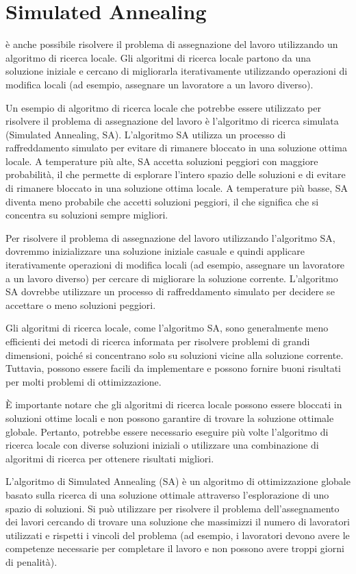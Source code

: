 \section {Simulated Annealing}
 è anche possibile risolvere il problema di assegnazione del lavoro utilizzando un algoritmo di ricerca locale. Gli algoritmi di ricerca locale partono da una soluzione iniziale e cercano di migliorarla iterativamente utilizzando operazioni di modifica locali (ad esempio, assegnare un lavoratore a un lavoro diverso).

Un esempio di algoritmo di ricerca locale che potrebbe essere utilizzato per risolvere il problema di assegnazione del lavoro è l'algoritmo di ricerca simulata (Simulated Annealing, SA). L'algoritmo SA utilizza un processo di raffreddamento simulato per evitare di rimanere bloccato in una soluzione ottima locale. A temperature più alte, SA accetta soluzioni peggiori con maggiore probabilità, il che permette di esplorare l'intero spazio delle soluzioni e di evitare di rimanere bloccato in una soluzione ottima locale. A temperature più basse, SA diventa meno probabile che accetti soluzioni peggiori, il che significa che si concentra su soluzioni sempre migliori.

Per risolvere il problema di assegnazione del lavoro utilizzando l'algoritmo SA, dovremmo inizializzare una soluzione iniziale casuale e quindi applicare iterativamente operazioni di modifica locali (ad esempio, assegnare un lavoratore a un lavoro diverso) per cercare di migliorare la soluzione corrente. L'algoritmo SA dovrebbe utilizzare un processo di raffreddamento simulato per decidere se accettare o meno soluzioni peggiori.

Gli algoritmi di ricerca locale, come l'algoritmo SA, sono generalmente meno efficienti dei metodi di ricerca informata per risolvere problemi di grandi dimensioni, poiché si concentrano solo su soluzioni vicine alla soluzione corrente. Tuttavia, possono essere facili da implementare e possono fornire buoni risultati per molti problemi di ottimizzazione.

È importante notare che gli algoritmi di ricerca locale possono essere bloccati in soluzioni ottime locali e non possono garantire di trovare la soluzione ottimale globale. Pertanto, potrebbe essere necessario eseguire più volte l'algoritmo di ricerca locale con diverse soluzioni iniziali o utilizzare una combinazione di algoritmi di ricerca per ottenere risultati migliori.


L'algoritmo di Simulated Annealing (SA) è un algoritmo di ottimizzazione globale basato sulla ricerca di una soluzione ottimale attraverso l'esplorazione di uno spazio di soluzioni. Si può utilizzare per risolvere il problema dell'assegnamento dei lavori cercando di trovare una soluzione che massimizzi il numero di lavoratori utilizzati e rispetti i vincoli del problema (ad esempio, i lavoratori devono avere le competenze necessarie per completare il lavoro e non possono avere troppi giorni di penalità).


